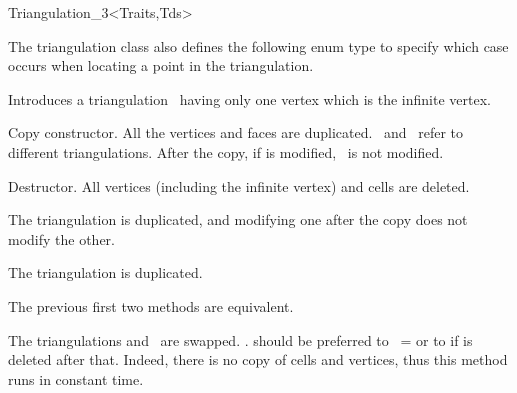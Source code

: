 \begin{ccClassTemplate}{Triangulation_3<Traits,Tds>}
\ccGlue
{}

\ccGlue
{}
\ccGlue
{}
\ccGlue
{}

\ccGlue
{}

The triangulation class also defines the following enum type to specify
which case occurs when locating a point in the triangulation. 

{}

\ccCreation
{}

{Introduces a triangulation \ccVar\ having only one vertex which is the
infinite vertex.} 

{Copy constructor. All the vertices and faces are duplicated.
\ccVar\ and \ refer to different triangulations. After the copy,
if  is modified, \ccVar\ is not modified.}

{Destructor. All vertices (including the infinite vertex) and cells are
deleted.}


{The triangulation  is duplicated, and modifying one after the 
copy does not modify the other.}

{The triangulation is duplicated.}

The previous first two methods are equivalent.

{The triangulations  and \ccVar\ are swapped.
\ccVar. should be preferred to \ccVar\ =  or to
 if  is deleted after that. Indeed, there is no
copy of cells and vertices, thus this method runs in constant time.}


\end{ccClassTemplate}
